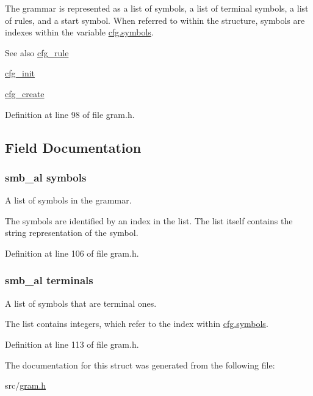 \-The grammar is represented as a list of symbols, a list of terminal symbols, a list of rules, and a start symbol. \-When referred to within the structure, symbols are indexes within the variable \hyperlink{structcfg_af90e802d07cdf4a88bde8043b57ec666}{cfg.\-symbols}.

\begin{DoxySeeAlso}{\-See also}
\hyperlink{structcfg__rule}{cfg\-\_\-rule} 

\hyperlink{gram_8h_ac3f72e0dc5203203c2b726e3b1e6a0ec}{cfg\-\_\-init} 

\hyperlink{gram_8h_a3bbb21266337299e9acb6241b547f121}{cfg\-\_\-create} 
\end{DoxySeeAlso}


\-Definition at line 98 of file gram.\-h.



\subsection{\-Field \-Documentation}
\hypertarget{structcfg_af90e802d07cdf4a88bde8043b57ec666}{
\subsubsection[{symbols}]{\setlength{\rightskip}{0pt plus 5cm}smb\-\_\-al {\bf symbols}}}\label{structcfg_af90e802d07cdf4a88bde8043b57ec666}


\-A list of symbols in the grammar. 

\-The symbols are identified by an index in the list. \-The list itself contains the string representation of the symbol. 

\-Definition at line 106 of file gram.\-h.

\hypertarget{structcfg_ae85a135e82c4af0e75739a21b3ec03b4}{
\subsubsection[{terminals}]{\setlength{\rightskip}{0pt plus 5cm}smb\-\_\-al {\bf terminals}}}\label{structcfg_ae85a135e82c4af0e75739a21b3ec03b4}


\-A list of symbols that are terminal ones. 

\-The list contains integers, which refer to the index within \hyperlink{structcfg_af90e802d07cdf4a88bde8043b57ec666}{cfg.\-symbols}. 

\-Definition at line 113 of file gram.\-h.



\-The documentation for this struct was generated from the following file\-:\begin{DoxyCompactItemize}
\item 
src/\hyperlink{gram_8h}{gram.\-h}\end{DoxyCompactItemize}
